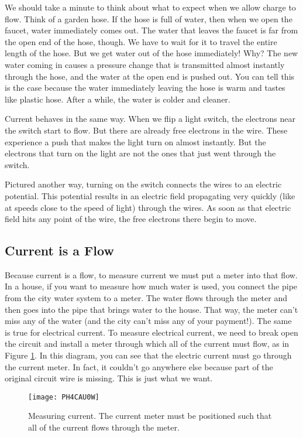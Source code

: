 We should take a minute to think about what to expect when we allow charge
to flow. Think of a garden hose. If the hose is full of water, then when we
open the faucet, water immediately comes out. The water that leaves the
faucet is far from the open end of the hose, though. We have to wait for it
to travel the entire length of the hose. But we get water out of the hose
immediately! Why? 
The new water coming in causes a
pressure change that is transmitted almost instantly 
through the hose, and the water at the open
end is pushed out. You can tell this is the case because the water
immediately leaving the hose is warm and tastes like plastic hose. After a
while, the water is colder and cleaner.

Current behaves in the same way. When we flip a light switch, the
electrons near the switch start to flow. But there are already free
electrons in the wire. These experience a push that makes the light turn on
almost instantly. But the electrons that turn on the light are not the ones
that just went through the switch.

Pictured another way, turning on the switch connects the wires to an electric
potential. This potential results in an electric field propagating very 
quickly (like at speeds close to the speed of light) through the wires. As 
soon as that electric field hits any point of the wire, the free 
electrons there begin to move.

\subsection{Current is a Flow}

Because current is a flow, to measure current we must put a meter into that
flow. In a house, if you want to measure how much water is used, you connect
the pipe from the city water system to a meter. The water flows through the
meter and then goes into the pipe that brings water to the house. That way,
the meter can't miss any of the water (and the city can't miss any of your
payment!). The same is true for electrical current. To measure electrical
current, we need to break open the circuit and install a meter through which
all of the current must flow, as in Figure \ref{fig:measuring_current}.
In this diagram, you can see that
the electric current must go through the current meter. In fact, it couldn't
go anywhere else because part of the original circuit wire is missing. This
is just what we want. 
\begin{figure}[htbp!]
\centering
\texttt{[image: PH4CAU0W]}
\caption[Measuring current]{Measuring current. The current meter must
be positioned such that all of the current flows through the meter.}
\label{fig:measuring_current}
\end{figure}

